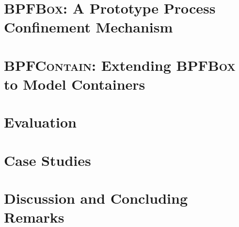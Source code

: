 \documentclass[
  fontsize=12pt,
  titlepage=firstiscover,
  paper=letter,
  oneside,
  cleardoublepage=plain,
  parskip=half-,
  DIV=10,
  parindent,
  appendixprefix,
  chapterprefix,
  listof=totoc,
]{scrbook}
\newcommand{\bpfbox}{\textsc{BPFBox}}
\newcommand{\bpfcontain}{\textsc{BPFContain}}
\begin{document}
\chapter{\bpfbox: A Prototype Process Confinement Mechanism}%
\label{c:bpfbox}


\chapter{\bpfcontain: Extending \bpfbox{} to Model Containers}%
\label{c:bpfcontain}


\chapter{Evaluation}%
\label{c:evaluation}


\chapter{Case Studies}%
\label{c:case-studies}


\chapter{Discussion and Concluding Remarks}%
\label{c:discussion}


% 

\cleardoublepage%
\printbibliography[heading=bibintoc]%

\appendix%
\printglossary[type=\acronymtype, title=List of Acronyms, toctitle=List of Acronyms]
\end{document}

